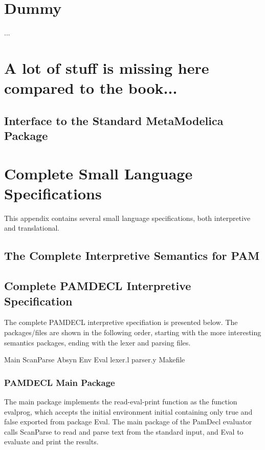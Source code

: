 \documentclass[10.5pt,a4]{article}
\begin{document}
\appendix

\section{Dummy}
...

\section{A lot of stuff is missing here compared to the book...}
\subsection{Interface to the Standard MetaModelica Package}


\section{Complete Small Language Specifications}
This appendix contains several small language specifications, both interpretive and translational.

\subsection{The Complete Interpretive Semantics for PAM}


\subsection{Complete PAMDECL Interpretive Specification}
The complete PAMDECL interpretive specifiation is presented below. The packages/files are shown in the following order, starting with the more interesting semantics packages, ending with the lexer and parsing files.

Main
ScanParse
Absyn
Env
Eval
lexer.l
parser.y
Makefile

\subsubsection{PAMDECL Main Package}
The main package implements the read-eval-print function as the function evalprog, which accepts the initial environment initial containing only true and false exported from package Eval.
The main package of the PamDecl evaluator calls ScanParse to read and parse text from the standard input, and Eval to evaluate and print the results.

\end{document}
